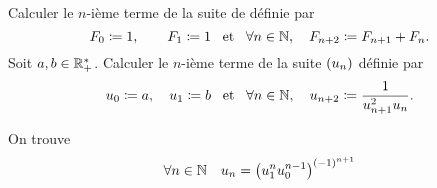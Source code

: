 \documentclass{magnolia}
\begin{document}
\begin{preuve}




\end{preuve}


\begin{exos}
\exo Calculer le $n$-ième terme de la suite de  définie par
  \[F_0\coloneqq 1, \qquad F_1\coloneqq 1 \quad\!\text{et}\quad\! \forall n\in\mathbb{N} ,\quad F_{n+2}\coloneqq F_{n+1}+F_n.\]
\exo Soit $a,b\in\mathbb{R}_+^*$. Calculer le $n$-ième terme de la suite $\left(u_n\right)$ définie par
  \[u_0\coloneqq a, \quad u_1\coloneqq b \quad\!\text{et}\quad\! \forall n\in\mathbb{N} ,\quad u_{n+2}\coloneqq\frac{1}{u_{n+1}^2u_n}.\]
  \begin{sol}
  On trouve
  \[\forall n\in\mathbb{N} \quad u_n=\left(u_1^n u_0^{n-1}\right)^{\left(-1\right)^{n+1}}\]
  \end{sol}
\end{exos}
\end{document}
